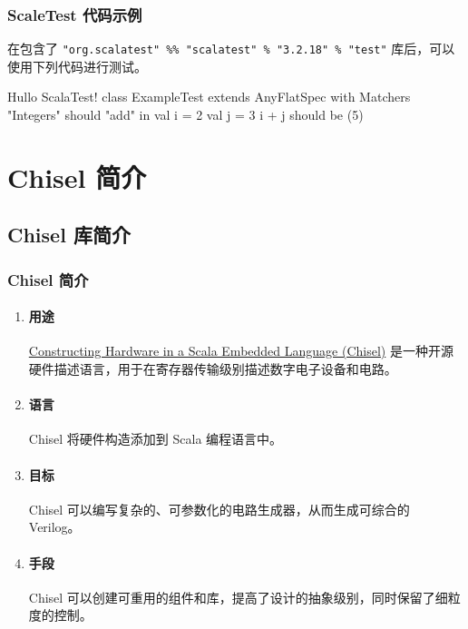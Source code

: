 \documentclass[xcolor=table,dvipsnames,svgnames,aspectratio=169]{ctexbeamer}
\begin{document}
\begin{frame}[fragile]
  \frametitle{ScaleTest 代码示例}
  在包含了 \lstinline|"org.scalatest" %% "scalatest" % "3.2.18" % "test"| 库后，可以使用下列代码进行测试。
  \begin{codeblock}[language=scala]{Hullo ScalaTest!}
class ExampleTest extends AnyFlatSpec with Matchers {
    "Integers" should "add" in {
        val i = 2
        val j = 3
        i + j should be (5)
    }
}
  \end{codeblock}
\end{frame}


\section{Chisel 简介}

\subsection{Chisel 库简介}

\begin{frame}
  \frametitle{Chisel 简介}
  \begin{enumerate}
    \item \paragraph{用途} \href{https://github.com/chipsalliance/chisel}{Constructing Hardware in a Scala Embedded Language (Chisel)} 是一种开源硬件描述语言，用于在寄存器传输级别描述数字电子设备和电路。
    \item \paragraph{语言} Chisel 将硬件构造添加到 Scala 编程语言中。
    \item \paragraph{目标} Chisel 可以编写复杂的、可参数化的电路生成器，从而生成可综合的 Verilog。
    \item \paragraph{手段} Chisel 可以创建可重用的组件和库，提高了设计的抽象级别，同时保留了细粒度的控制。
  \end{enumerate}
\end{frame}
\end{document}
